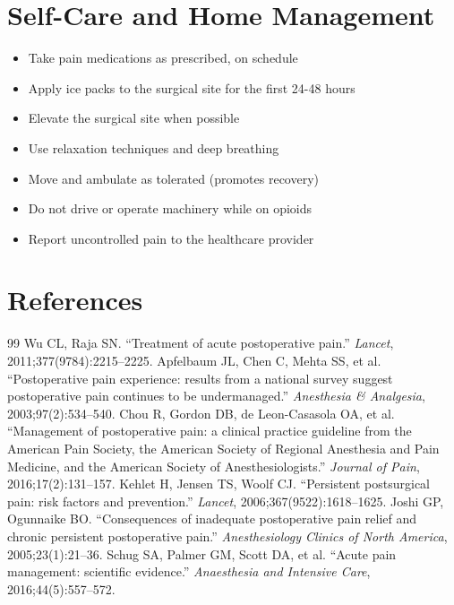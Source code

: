 \section*{Self-Care and Home Management}
\begin{itemize}
\item Take pain medications as prescribed, on schedule
\item Apply ice packs to the surgical site for the first 24-48 hours
\item Elevate the surgical site when possible
\item Use relaxation techniques and deep breathing
\item Move and ambulate as tolerated (promotes recovery)
\item Do not drive or operate machinery while on opioids
\item Report uncontrolled pain to the healthcare provider
\end{itemize}

\section*{References}
\begin{thebibliography}{99}
 Wu CL, Raja SN. ``Treatment of acute postoperative pain.'' \textit{Lancet}, 2011;377(9784):2215--2225.
 Apfelbaum JL, Chen C, Mehta SS, et al. ``Postoperative pain experience: results from a national survey suggest postoperative pain continues to be undermanaged.'' \textit{Anesthesia \& Analgesia}, 2003;97(2):534--540.
 Chou R, Gordon DB, de Leon-Casasola OA, et al. ``Management of postoperative pain: a clinical practice guideline from the American Pain Society, the American Society of Regional Anesthesia and Pain Medicine, and the American Society of Anesthesiologists.'' \textit{Journal of Pain}, 2016;17(2):131--157.
 Kehlet H, Jensen TS, Woolf CJ. ``Persistent postsurgical pain: risk factors and prevention.'' \textit{Lancet}, 2006;367(9522):1618--1625.
 Joshi GP, Ogunnaike BO. ``Consequences of inadequate postoperative pain relief and chronic persistent postoperative pain.'' \textit{Anesthesiology Clinics of North America}, 2005;23(1):21--36.
 Schug SA, Palmer GM, Scott DA, et al. ``Acute pain management: scientific evidence.'' \textit{Anaesthesia and Intensive Care}, 2016;44(5):557--572.

\end{thebibliography}
